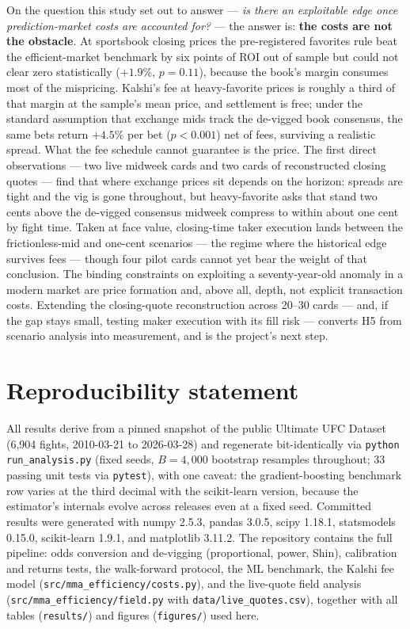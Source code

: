 \documentclass[11pt]{article}
\newcommand{\devig}{de-vigged}
\begin{document}
On the question this study set out to answer --- \emph{is there an exploitable edge once
prediction-market costs are accounted for?} --- the answer is: \textbf{the costs are not the
obstacle}. At sportsbook closing prices the pre-registered favorites rule beat the
efficient-market benchmark by six points of ROI out of sample but could not clear zero
statistically ($+1.9\%$, $p = 0.11$), because the book's margin consumes most of the mispricing.
Kalshi's fee at heavy-favorite prices is roughly a third of that margin at the sample's mean
price, and settlement is free; under the standard assumption that exchange mids track the \devig{} book consensus, the
same bets return $+4.5\%$ per bet ($p < 0.001$) net of fees, surviving a realistic spread. What
the fee schedule cannot guarantee is the price. The first direct observations --- two live
midweek cards and two cards of reconstructed closing quotes --- find that where exchange prices
sit depends on the horizon: spreads are tight and the vig is gone throughout, but heavy-favorite
asks that stand two cents above the \devig{} consensus midweek compress to within about one cent
by fight time. Taken at face value, closing-time taker execution lands between the
frictionless-mid and one-cent scenarios --- the regime where the historical edge survives fees
--- though four pilot cards cannot yet bear the weight of that conclusion. The binding
constraints on exploiting a seventy-year-old anomaly in a modern market are price formation and,
above all, depth, not explicit transaction costs. Extending the closing-quote reconstruction
across 20--30 cards --- and, if the gap stays small, testing maker execution with its fill risk
--- converts H5 from scenario analysis into measurement, and is the project's next step.

\section*{Reproducibility statement}

All results derive from a pinned snapshot of the public Ultimate UFC Dataset (6{,}904 fights,
2010-03-21 to 2026-03-28) and regenerate bit-identically via \texttt{python run\_analysis.py}
(fixed seeds, $B = 4{,}000$ bootstrap resamples throughout; 33 passing unit tests via
\texttt{pytest}), with one caveat: the gradient-boosting benchmark row varies at the third
decimal with the scikit-learn version, because the estimator's internals evolve across releases
even at a fixed seed. Committed results were generated with numpy 2.5.3, pandas 3.0.5, scipy
1.18.1, statsmodels 0.15.0, scikit-learn 1.9.1, and matplotlib 3.11.2. The repository contains
the full pipeline: odds conversion and de-vigging
(proportional, power, Shin), calibration and returns tests, the walk-forward protocol, the ML
benchmark, the Kalshi fee model (\texttt{src/mma\_efficiency/costs.py}), and the live-quote
field analysis (\texttt{src/mma\_efficiency/field.py} with \texttt{data/live\_quotes.csv}),
together with all tables (\texttt{results/}) and figures (\texttt{figures/}) used here.
\end{document}
